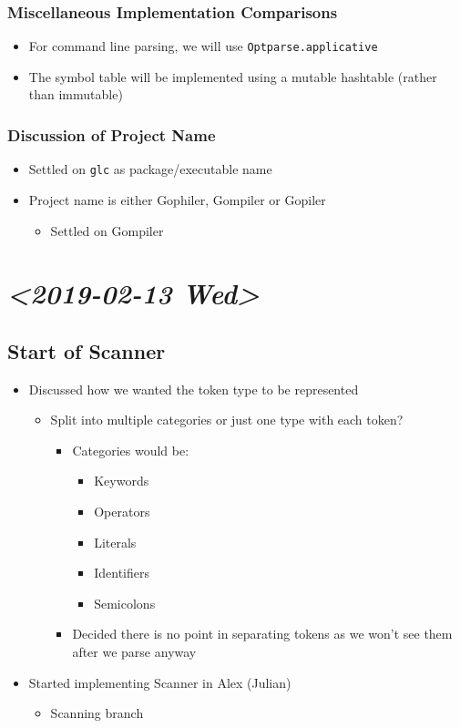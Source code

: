 \documentclass[11pt]{article}
\begin{document}
\subsubsection{Miscellaneous Implementation Comparisons}
\label{sec:org80c913b}
\begin{itemize}
\item For command line parsing, we will use \texttt{Optparse.applicative}
\item The symbol table will be implemented using a mutable hashtable
(rather than immutable)
\end{itemize}
\subsubsection{Discussion of Project Name}
\label{sec:org2fc3b68}
\begin{itemize}
\item Settled on \texttt{glc} as package/executable name
\item Project name is either Gophiler, Gompiler or Gopiler
\begin{itemize}
\item Settled on Gompiler
\end{itemize}
\end{itemize}
\section{\textit{<2019-02-13 Wed>}}
\label{sec:orga5a5d99}
\subsection{Start of Scanner}
\label{sec:org62150bc}
\begin{itemize}
\item Discussed how we wanted the token type to be represented
\begin{itemize}
\item Split into multiple categories or just one type with each token?
\begin{itemize}
\item Categories would be:
\begin{itemize}
\item Keywords
\item Operators
\item Literals
\item Identifiers
\item Semicolons
\end{itemize}
\item Decided there is no point in separating tokens as we won't see
them after we parse anyway
\end{itemize}
\end{itemize}
\item Started implementing Scanner in Alex (Julian)
\begin{itemize}
\item Scanning branch
\end{itemize}
\end{itemize}
\end{document}
